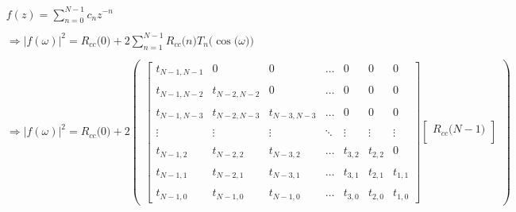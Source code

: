 \documentclass{article}
\begin{document}
\begin{align*}
    & f(z) = \sum_{n = 0}^{N - 1}c_{n}z^{-n} \\ \\
    &\Rightarrow |f(\omega)|^{2} = R_{cc}\big(0\big) + 2\sum_{n=1}^{N - 1}R_{cc}\big(n\big)T_{n}\Big(\cos\big(\omega\big)\Big) \\ \\ 
    &\Rightarrow |f(\omega)|^{2} = R_{cc}\big(0\big) + 2\begin{pmatrix}
                                                            \begin{bmatrix}
                                                                t_{N - 1, N - 1} &                0 &                0 & \ldots &        0 &        0 &        0 \\ \\
                                                                t_{N - 1, N - 2} & t_{N - 2, N - 2} &                0 & \ldots &        0 &        0 &        0 \\ \\
                                                                t_{N - 1, N - 3} & t_{N - 2, N - 3} & t_{N - 3, N - 3} & \ldots &        0 &        0 &        0 \\ \\
                                                                \vdots &           \vdots &           \vdots & \ddots &   \vdots &   \vdots &   \vdots \\ \\
                                                                t_{N - 1,     2} & t_{N - 2,     2} & t_{N - 3,     2} & \ldots & t_{3, 2} & t_{2, 2} &        0 \\ \\
                                                                t_{N - 1,     1} & t_{N - 2,     1} & t_{N - 3,     1} & \ldots & t_{3, 1} & t_{2, 1} & t_{1, 1} \\ \\
                                                                t_{N - 1,     0} & t_{N - 1,     0} & t_{N - 1,     0} & \ldots & t_{3, 0} & t_{2, 0} & t_{1, 0} 
                                                              \end{bmatrix}
                                                            \begin{bmatrix}
                                                                R_{cc}\big(N - 1\big) \\

\end{bmatrix}
\end{pmatrix}
\end{align*}
\end{document}
